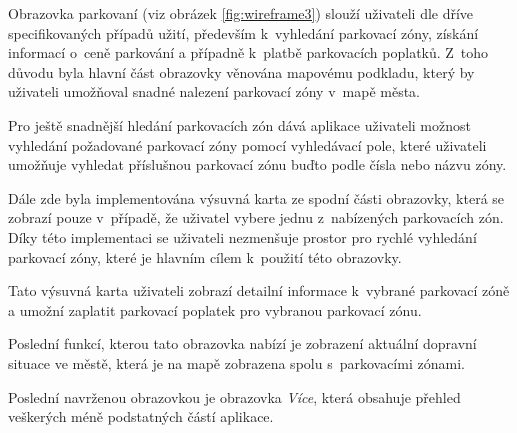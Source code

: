 \begin{minipage}[t]{0.45\textwidth}
Obrazovka parkovaní (viz obrázek \ref{fig:wireframe3}) slouží uživateli dle dříve specifikovaných případů užití, především k~vyhledání parkovací zóny, 
získání informací o~ceně parkování a případně k~platbě parkovacích poplatků. Z~toho důvodu byla hlavní část obrazovky věnována mapovému podkladu, 
který by uživateli umožňoval snadné nalezení parkovací zóny v~mapě města. %


Pro ještě snadnější hledání parkovacích zón dává aplikace uživateli možnost vyhledání požadované parkovací zóny pomocí vyhledávací pole, které 
uživateli umožňuje vyhledat příslušnou parkovací zónu buďto podle čísla nebo názvu zóny. 

Dále zde byla implementována výsuvná karta ze spodní části obrazovky, která se zobrazí pouze v~případě, že uživatel vybere jednu
z~nabízených parkovacích zón. Díky této implementaci se uživateli nezmenšuje prostor pro rychlé vyhledání parkovací zóny,
které je hlavním cílem k~použití této obrazovky. 

Tato výsuvná karta uživateli zobrazí detailní informace k~vybrané parkovací zóně a umožní zaplatit parkovací poplatek pro vybranou parkovací zónu.

Poslední funkcí, kterou tato obrazovka nabízí je zobrazení aktuální dopravní situace ve městě, která je na mapě zobrazena spolu s~parkovacími zónami.

\bigskip
{}
Poslední navrženou obrazovkou je obrazovka \textit{Více}, která obsahuje přehled veškerých méně podstatných částí aplikace.







\end{minipage}
